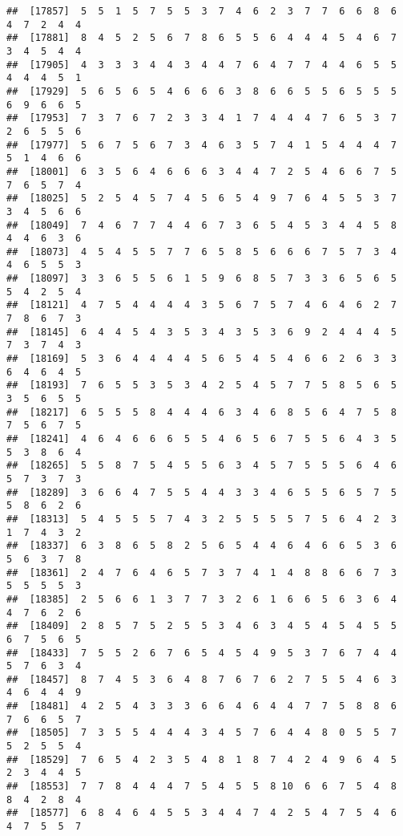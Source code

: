 \documentclass[
]{book}
\begin{document}
\begin{verbatim}
##  [17857]  5  5  1  5  7  5  5  3  7  4  6  2  3  7  7  6  6  8  6  4  7  2  4  4
##  [17881]  8  4  5  2  5  6  7  8  6  5  5  6  4  4  4  5  4  6  7  3  4  5  4  4
##  [17905]  4  3  3  3  4  4  3  4  4  7  6  4  7  7  4  4  6  5  5  4  4  4  5  1
##  [17929]  5  6  5  6  5  4  6  6  6  3  8  6  6  5  5  6  5  5  5  6  9  6  6  5
##  [17953]  7  3  7  6  7  2  3  3  4  1  7  4  4  4  7  6  5  3  7  2  6  5  5  6
##  [17977]  5  6  7  5  6  7  3  4  6  3  5  7  4  1  5  4  4  4  7  5  1  4  6  6
##  [18001]  6  3  5  6  4  6  6  6  3  4  4  7  2  5  4  6  6  7  5  7  6  5  7  4
##  [18025]  5  2  5  4  5  7  4  5  6  5  4  9  7  6  4  5  5  3  7  3  4  5  6  6
##  [18049]  7  4  6  7  7  4  4  6  7  3  6  5  4  5  3  4  4  5  8  4  4  6  3  6
##  [18073]  4  5  4  5  5  7  7  6  5  8  5  6  6  6  7  5  7  3  4  4  6  5  5  3
##  [18097]  3  3  6  5  5  6  1  5  9  6  8  5  7  3  3  6  5  6  5  5  4  2  5  4
##  [18121]  4  7  5  4  4  4  4  3  5  6  7  5  7  4  6  4  6  2  7  7  8  6  7  3
##  [18145]  6  4  4  5  4  3  5  3  4  3  5  3  6  9  2  4  4  4  5  7  3  7  4  3
##  [18169]  5  3  6  4  4  4  4  5  6  5  4  5  4  6  6  2  6  3  3  6  4  6  4  5
##  [18193]  7  6  5  5  3  5  3  4  2  5  4  5  7  7  5  8  5  6  5  3  5  6  5  5
##  [18217]  6  5  5  5  8  4  4  4  6  3  4  6  8  5  6  4  7  5  8  7  5  6  7  5
##  [18241]  4  6  4  6  6  6  5  5  4  6  5  6  7  5  5  6  4  3  5  5  3  8  6  4
##  [18265]  5  5  8  7  5  4  5  5  6  3  4  5  7  5  5  5  6  4  6  5  7  3  7  3
##  [18289]  3  6  6  4  7  5  5  4  4  3  3  4  6  5  5  6  5  7  5  5  8  6  2  6
##  [18313]  5  4  5  5  5  7  4  3  2  5  5  5  5  7  5  6  4  2  3  1  7  4  3  2
##  [18337]  6  3  8  6  5  8  2  5  6  5  4  4  6  4  6  6  5  3  6  5  6  3  7  8
##  [18361]  2  4  7  6  4  6  5  7  3  7  4  1  4  8  8  6  6  7  3  5  5  5  5  3
##  [18385]  2  5  6  6  1  3  7  7  3  2  6  1  6  6  5  6  3  6  4  4  7  6  2  6
##  [18409]  2  8  5  7  5  2  5  5  3  4  6  3  4  5  4  5  4  5  5  6  7  5  6  5
##  [18433]  7  5  5  2  6  7  6  5  4  5  4  9  5  3  7  6  7  4  4  5  7  6  3  4
##  [18457]  8  7  4  5  3  6  4  8  7  6  7  6  2  7  5  5  4  6  3  4  6  4  4  9
##  [18481]  4  2  5  4  3  3  3  6  6  4  6  4  4  7  7  5  8  8  6  7  6  6  5  7
##  [18505]  7  3  5  5  4  4  4  3  4  5  7  6  4  4  8  0  5  5  7  5  2  5  5  4
##  [18529]  7  6  5  4  2  3  5  4  8  1  8  7  4  2  4  9  6  4  5  2  3  4  4  5
##  [18553]  7  7  8  4  4  4  7  5  4  5  5  8 10  6  6  7  5  4  8  8  4  2  8  4
##  [18577]  6  8  4  6  4  5  5  3  4  4  7  4  2  5  4  7  5  4  6  4  7  5  5  7

\end{verbatim}
\end{document}
